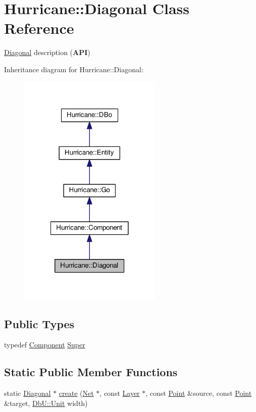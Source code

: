 \hypertarget{classHurricane_1_1Diagonal}{}\section{Hurricane\+:\+:Diagonal Class Reference}
\label{classHurricane_1_1Diagonal}


\hyperlink{classHurricane_1_1Diagonal}{Diagonal} description ({\bfseries A\+PI})  




Inheritance diagram for Hurricane\+:\+:Diagonal\+:\nopagebreak
\begin{figure}[H]
\begin{center}
\leavevmode
\includegraphics[width=194pt]{classHurricane_1_1Diagonal__inherit__graph}
\end{center}
\end{figure}
\subsection*{Public Types}
\begin{DoxyCompactItemize}
\item 
typedef \hyperlink{classHurricane_1_1Component}{Component} \hyperlink{classHurricane_1_1Diagonal_aef5120a04b3b4db78b118e8c5daade90}{Super}
\end{DoxyCompactItemize}
\subsection*{Static Public Member Functions}
\begin{DoxyCompactItemize}
\item 
static \hyperlink{classHurricane_1_1Diagonal}{Diagonal} $\ast$ \hyperlink{classHurricane_1_1Diagonal_a83cd4332e78515e2c3745fd017e7441f}{create} (\hyperlink{classHurricane_1_1Net}{Net} $\ast$, const \hyperlink{classHurricane_1_1Layer}{Layer} $\ast$, const \hyperlink{classHurricane_1_1Point}{Point} \&source, const \hyperlink{classHurricane_1_1Point}{Point} \&target, \hyperlink{group__DbUGroup_ga4fbfa3e8c89347af76c9628ea06c4146}{Db\+U\+::\+Unit} width)
\end{DoxyCompactItemize}

